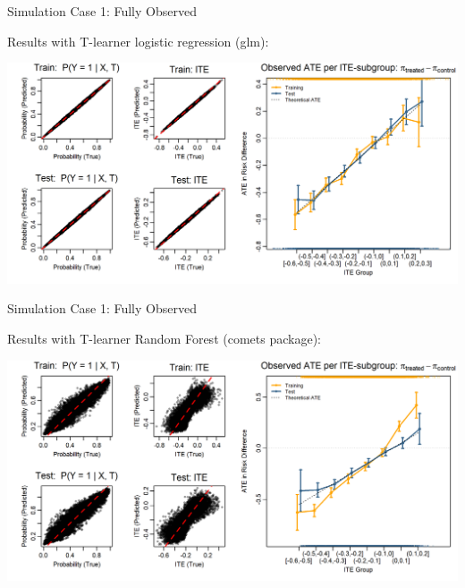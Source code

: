 \documentclass[onlytextwidth,english]{beamer}\usepackage[]{graphicx}\usepackage[]{xcolor}
\begin{document}
\begin{frame}{Simulation Case 1: Fully Observed}

Results with T-learner logistic regression (glm):

\includegraphics[width=\textwidth]{img/fully_observed_glm_tlearner.png}

\end{frame}


\begin{frame}{Simulation Case 1: Fully Observed}

Results with T-learner Random Forest (comets package):

\includegraphics[width=\textwidth]{img/observed_tuned_rf.png}

\end{frame}
\end{document}
